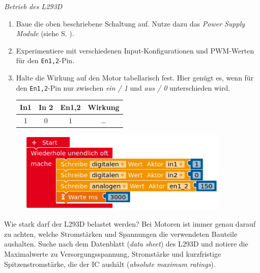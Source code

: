 \begin{aufgabe} \emph{Betrieb des L293D}
	
	\medskip
	\begin{minipage}{0.53\textwidth}
		\begin{enumerate}[label=\alph*), itemsep=0mm, parsep=0mm]
			\item Baue die oben beschriebene Schaltung auf. Nutze dazu das \emph{Power Supply Module} (siehe S. \pageref{powersupplymodule}).
			\item Experimentiere mit verschiedenen Input-Konfigurationen und PWM-Werten für den \texttt{En1,2}-Pin. 
			
			\item Halte die Wirkung auf den Motor tabellarisch fest. Hier genügt es, wenn für den \texttt{En1,2}-Pin nur zwischen \emph{ein / 1} und \emph{aus / 0} unterschieden wird.
			
			\begin{tabular}{c|c|c|c}
				In1 & In 2 & En1,2 & Wirkung \\ \hline
				1 & 0 & 1 & \dots \\
			\end{tabular}
		\end{enumerate}
	\end{minipage}
	\hfill
	\begin{minipage}{0.45\textwidth}
		\begin{figure}[H]
			\centering
			\includegraphics[width=0.9\textwidth]{./pics/prog-motorsteuerung-l293d.png}
		\end{figure}
	\end{minipage}
\end{aufgabe}

\begin{recherche}{Wie stark darf der L293D belastet werden?}
	Bei Motoren ist immer genau darauf zu achten, welche Stromstärken und Spannungen die verwendeten Bauteile aushalten. Suche nach dem Datenblatt (\emph{data sheet}) des L293D und notiere die Maximalwerte zu Versorgungsspannung, Stromstärke und kurzfristige Spitzenstromstärke, die der IC aushält (\emph{absolute maximum ratings}). 
\end{recherche}


